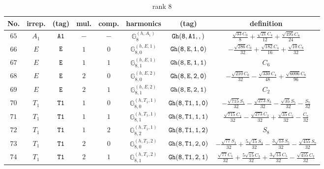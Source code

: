 \documentclass[fleqn,8pt]{jsarticle}
\begin{document}
\begin{table}[ht!]
\begin{center}
\caption{rank 8}
\renewcommand{\arraystretch}{1.3}
\begin{tabular}{cccccccc} \hline \hline
No. & irrep. & (tag) & mul. & comp. & harmonics & (tag) & definition \\ \hline
$ 65 $ & $ A_{1} $ & $ {\tt A1} $ & $ - $ & $ - $ & $ \mathbb{G}_{8}^{(h,A_{1})} $ & $ {\tt Gh(8,A1,,)} $ & $ \frac{\sqrt{33} C_{0}}{8} + \frac{\sqrt{21} C_{4}}{12} + \frac{\sqrt{195} C_{8}}{24} $ \\
$ 66 $ & $ E $ & $ {\tt E} $ & $ 1 $ & $ 0 $ & $ \mathbb{G}_{8,0}^{(h,E,1)} $ & $ {\tt Gh(8,E,1,0)} $ & $ - \frac{\sqrt{286} C_{0}}{32} + \frac{\sqrt{182} C_{4}}{16} + \frac{\sqrt{10} C_{8}}{32} $ \\
$ 67 $ & $ E $ & $ {\tt E} $ & $ 1 $ & $ 1 $ & $ \mathbb{G}_{8,1}^{(h,E,1)} $ & $ {\tt Gh(8,E,1,1)} $ & $ C_{6} $ \\
$ 68 $ & $ E $ & $ {\tt E} $ & $ 2 $ & $ 0 $ & $ \mathbb{G}_{8,0}^{(h,E,2)} $ & $ {\tt Gh(8,E,2,0)} $ & $ - \frac{\sqrt{210} C_{0}}{32} - \frac{\sqrt{330} C_{4}}{48} + \frac{\sqrt{6006} C_{8}}{96} $ \\
$ 69 $ & $ E $ & $ {\tt E} $ & $ 2 $ & $ 1 $ & $ \mathbb{G}_{8,1}^{(h,E,2)} $ & $ {\tt Gh(8,E,2,1)} $ & $ C_{2} $ \\
$ 70 $ & $ T_{1} $ & $ {\tt T1} $ & $ 1 $ & $ 0 $ & $ \mathbb{G}_{8,0}^{(h,T_{1},1)} $ & $ {\tt Gh(8,T1,1,0)} $ & $ - \frac{\sqrt{715} S_{1}}{32} - \frac{\sqrt{273} S_{3}}{32} - \frac{\sqrt{35} S_{5}}{32} - \frac{S_{7}}{32} $ \\
$ 71 $ & $ T_{1} $ & $ {\tt T1} $ & $ 1 $ & $ 1 $ & $ \mathbb{G}_{8,1}^{(h,T_{1},1)} $ & $ {\tt Gh(8,T1,1,1)} $ & $ \frac{\sqrt{715} C_{1}}{32} - \frac{\sqrt{273} C_{3}}{32} + \frac{\sqrt{35} C_{5}}{32} - \frac{C_{7}}{32} $ \\
$ 72 $ & $ T_{1} $ & $ {\tt T1} $ & $ 1 $ & $ 2 $ & $ \mathbb{G}_{8,2}^{(h,T_{1},1)} $ & $ {\tt Gh(8,T1,1,2)} $ & $ S_{8} $ \\
$ 73 $ & $ T_{1} $ & $ {\tt T1} $ & $ 2 $ & $ 0 $ & $ \mathbb{G}_{8,0}^{(h,T_{1},2)} $ & $ {\tt Gh(8,T1,2,0)} $ & $ - \frac{\sqrt{77} S_{1}}{32} + \frac{5 \sqrt{15} S_{3}}{32} - \frac{3 \sqrt{13} S_{5}}{32} - \frac{\sqrt{455} S_{7}}{32} $ \\
$ 74 $ & $ T_{1} $ & $ {\tt T1} $ & $ 2 $ & $ 1 $ & $ \mathbb{G}_{8,1}^{(h,T_{1},2)} $ & $ {\tt Gh(8,T1,2,1)} $ & $ \frac{\sqrt{77} C_{1}}{32} + \frac{5 \sqrt{15} C_{3}}{32} + \frac{3 \sqrt{13} C_{5}}{32} - \frac{\sqrt{455} C_{7}}{32} $ \\

\end{tabular}
\end{center}
\end{table}
\end{document}
